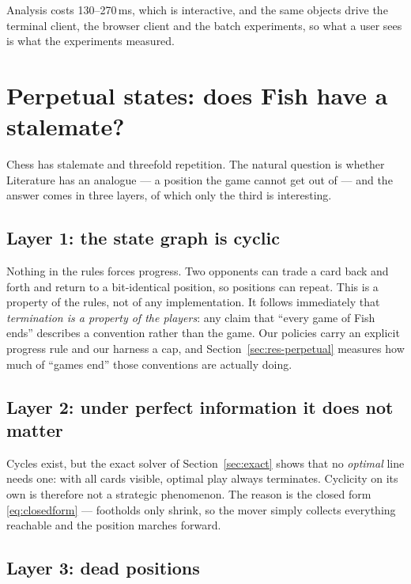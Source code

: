 \documentclass[11pt,a4paper]{article}
\begin{document}
Analysis costs 130--270\,ms, which is interactive, and the same objects drive
the terminal client, the browser client and the batch experiments, so what a
user sees is what the experiments measured.

\section{Perpetual states: does Fish have a stalemate?}
\label{sec:perpetual}

Chess has stalemate and threefold repetition. The natural question is whether
Literature has an analogue --- a position the game cannot get out of --- and the
answer comes in three layers, of which only the third is interesting.

\subsection{Layer 1: the state graph is cyclic}

Nothing in the rules forces progress. Two opponents can trade a card back and
forth and return to a bit-identical position, so positions can repeat. This is a
property of the rules, not of any implementation. It follows immediately that
\emph{termination is a property of the players}: any claim that ``every game of
Fish ends'' describes a convention rather than the game. Our policies carry an
explicit progress rule and our harness a cap, and Section~\ref{sec:res-perpetual}
measures how much of ``games end'' those conventions are actually doing.

\subsection{Layer 2: under perfect information it does not matter}

Cycles exist, but the exact solver of Section~\ref{sec:exact} shows that no
\emph{optimal} line needs one: with all cards visible, optimal play always
terminates. Cyclicity on its own is therefore not a strategic phenomenon. The
reason is the closed form \eqref{eq:closedform} --- footholds only shrink, so the
mover simply collects everything reachable and the position marches forward.

\subsection{Layer 3: dead positions}
\end{document}
